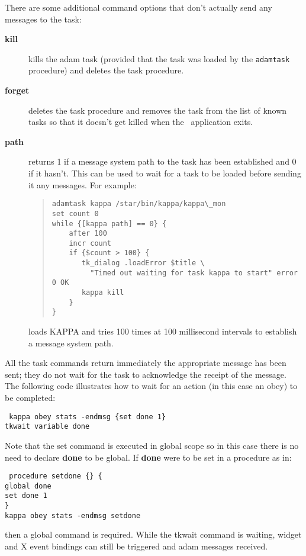 There are some additional command options that don't actually send any messages
to the task:

\begin{description}
\item [{\bf kill}] kills the adam task (provided that the task was loaded
by the {\tt adamtask} procedure) and deletes the task procedure.
\item [{\bf forget}] deletes the task procedure and removes the task from
the list of known tasks so that it doesn't get killed when the \Tcl\ application
exits.
\item [{\bf path}]  returns 1
if a message system path to the task has been established and 0 if it hasn't.
This can be used to wait for a task to be loaded before sending it any
messages. For example:

\begin{quote}
\begin{verbatim}
adamtask kappa /star/bin/kappa/kappa\_mon
set count 0
while {[kappa path] == 0} {
    after 100
    incr count
    if {$count > 100} {
       tk_dialog .loadError $title \
         "Timed out waiting for task kappa to start" error 0 OK
       kappa kill
    }
}
\end{verbatim}
\end{quote}

loads KAPPA and tries 100 times at 100 millisecond intervals to establish
a message system path.
\end{description}

All the task commands return immediately the appropriate message has been
sent; they do not wait for the task to acknowledge the receipt of the
message. The following code illustrates how to wait for an action (in
this case an obey) to be completed:
\begin{tquote}{\tt
kappa obey stats -endmsg \{set done 1\}\\
tkwait variable done
}\end{tquote}
Note that the set command is executed in global scope so in this case there
is no need to declare {\bf done} to be global. If {\bf done} were to be
set in a procedure as in:
\begin{tquote}{\tt
procedure setdone \{\} \{\\
\hspace*{2em}global done\\
\hspace*{2em}set done 1\\
\}\\
kappa obey stats -endmsg setdone
}\end{tquote}
then a global command is required. While the tkwait command is waiting,
widget and X event bindings can still be triggered and adam messages
received.

